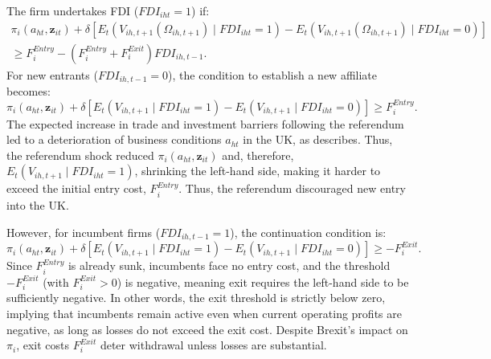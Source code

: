 \documentclass[preprint,11pt,authoryear]{elsarticle}
\begin{document}
The firm undertakes FDI ($FDI_{iht} = 1$) if:
\begin{align}\label{eq:FDIcondition}
    \pi_i(a_{ht}, \mathbf{z}_{it}) 
    + \delta \left[ E_t \left( V_{ih,t+1}(\Omega_{ih,t+1}) \mid FDI_{iht} = 1 \right) 
    - E_t \left( V_{ih,t+1}(\Omega_{ih,t+1}) \mid FDI_{iht} = 0 \right) \right] \\ \nonumber 
    \geq F_i^{Entry} - (F_i^{Entry} + F_i^{Exit}) FDI_{ih,t-1}.
\end{align}
For new entrants ($FDI_{ih,t-1} = 0$), the condition to establish a new affiliate becomes:
\begin{equation}\label{eq:entry}
\pi_i(a_{ht}, \mathbf{z}_{it}) + \delta \left[ E_t \left( V_{ih,t+1} \mid FDI_{iht} = 1 \right) - E_t \left( V_{ih,t+1} \mid FDI_{iht} = 0 \right) \right] \geq F_i^{Entry}.
\end{equation}
The expected increase in trade and investment barriers following the referendum led to a deterioration of business conditions $a_{ht}$ in the UK, as \cite{dhingra2022expecting} describes. Thus, the referendum shock reduced $\pi_i(a_{ht}, \mathbf{z}_{it})$ and, therefore, $E_t \left( V_{ih,t+1} \mid FDI_{iht} = 1 \right)$, shrinking the left-hand side, making it harder to exceed the initial entry cost, $F_i^{Entry}$. Thus, the referendum discouraged new entry into the UK.

However, for incumbent firms ($FDI_{ih,t-1} = 1$), the continuation condition is:
\begin{equation}\label{eq:exit}
    \pi_i(a_{ht}, \mathbf{z}_{it}) + \delta \left[ E_t \left( V_{ih,t+1} \mid FDI_{iht} = 1 \right) - E_t \left( V_{ih,t+1} \mid FDI_{iht} = 0 \right) \right] \geq -F_i^{Exit}.
\end{equation}
Since $F_i^{Entry}$ is already sunk, incumbents face no entry cost, and the threshold $-F_i^{Exit}$ (with $F_i^{Exit} > 0$) is negative, meaning exit requires the left-hand side to be sufficiently negative. 
In other words, the exit threshold is strictly below zero, implying that incumbents remain active even when current operating profits are negative, as long as losses do not exceed the exit cost.
Despite Brexit's impact on $\pi_i$, exit costs $F_i^{Exit}$ deter withdrawal unless losses are substantial. 
\end{document}
